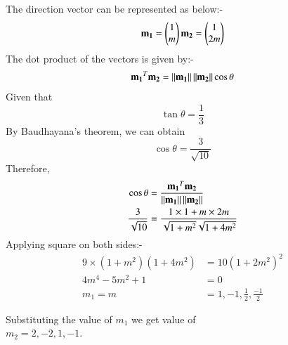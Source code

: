 The direction vector can be represented as below:-
\begin{align}
\mathbf{m_{1}} =\begin{pmatrix} 1 \\m \end{pmatrix}
\mathbf{m_{2}} =\begin{pmatrix}1\\2m\end{pmatrix}
 \end{align}
The dot product of the vectors is given by:-
\begin{align}
 \mathbf{m_{1}} ^T  \mathbf{m_{2}} = \left\lVert  \mathbf{ m_{1}}\right\rVert\left\lVert  \mathbf{m_{2}}\right\rVert  \cos \theta
\end{align}
Given that 
\begin{equation}
 \tan \theta = \frac{1}{3}
 \end{equation}
 By Baudhayana's theorem, we can obtain
\begin{equation}
 \cos \theta = \frac{3}{\sqrt{10}}
 \end{equation}
Therefore,
\begin{align}
\cos \theta &= \frac{\mathbf{m_{1}}^T  \mathbf{m_{2}}}{\mathbf{\left\lVert m_{1}\right\rVert} \left\lVert \mathbf{m_{2}}\right\rVert}\\
\frac{3}{\sqrt{10}} &=  \frac{1 \times 1 + {m \times 2m}}{{\sqrt{1 + m^2}\sqrt{1 +4 m^2}}}
\end{align}
Applying square on both sides:-
\begin{align}
9 \times (1 + m^2) (1 + 4 m^2) & = 10 ( 1 + 2 m^2)^2\\ 
4 m^4 - 5 m^2 + 1 &=0\\ 
m_{1} = m &= 1, -1,\frac{1}{2},\frac{-1}{2}
\end{align}

Substituting the value of $ m_{1}$ we get value of\\
$ m_{2} = 2, -2, 1, -1$.\\

